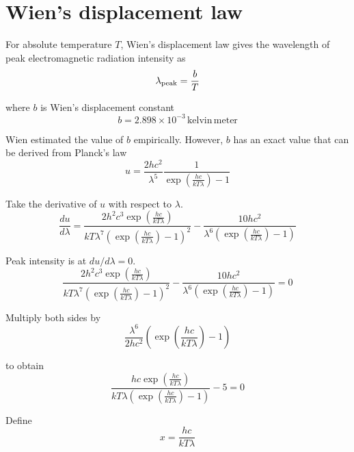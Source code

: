 

\section*{Wien's displacement law}

For absolute temperature $T$,
Wien's displacement law gives the wavelength
of peak electromagnetic radiation intensity as
\begin{equation*}
\lambda_{\rm peak}=\frac{b}{T}
\end{equation*}

where $b$ is Wien's displacement constant
\begin{equation*}
b=2.898\times10^{-3}\,\text{kelvin}\,\text{meter}
\end{equation*}

Wien estimated the value of $b$ empirically.
However, $b$ has an exact value that can be derived from Planck's law
\begin{equation*}
u=\frac{2hc^2}{\lambda^5}\frac{1}{\exp\left(\frac{hc}{kT\lambda}\right)-1}
\end{equation*}

Take the derivative of $u$ with respect to $\lambda$.
\begin{equation*}
\frac{du}{d\lambda}
=\frac{2h^2c^3\exp\left(\frac{hc}{kT\lambda}\right)}
{kT\lambda^7\left(\exp\left(\frac{hc}{kT\lambda}\right)-1\right)^2}
-\frac{10hc^2}{\lambda^6\left(\exp\left(\frac{hc}{kT\lambda}\right)-1\right)}
\end{equation*}

Peak intensity is at $du/d\lambda=0$.
\begin{equation*}
\frac{2h^2c^3\exp\left(\frac{hc}{kT\lambda}\right)}
{kT\lambda^7\left(\exp\left(\frac{hc}{kT\lambda}\right)-1\right)^2}
-\frac{10hc^2}{\lambda^6\left(\exp\left(\frac{hc}{kT\lambda}\right)-1\right)}=0
\end{equation*}

Multiply both sides by
\begin{equation*}
\frac{\lambda^6}{2hc^2}\left(\exp\left(\frac{hc}{kT\lambda}\right)-1\right)
\end{equation*}

to obtain
\begin{equation*}
\frac{hc\exp\left(\frac{hc}{kT\lambda}\right)}
{kT\lambda\left(\exp\left(\frac{hc}{kT\lambda}\right)-1\right)}-5=0
\end{equation*}

Define
\begin{equation*}
x=\frac{hc}{kT\lambda}
\end{equation*}

